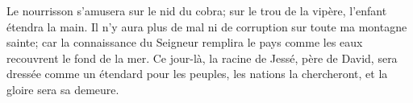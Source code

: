 Le nourrisson s’amusera sur le nid du cobra;
	sur le trou de la vipère, l’enfant étendra la main.
Il n’y aura plus de mal ni de corruption sur toute ma montagne sainte;
	car la connaissance du Seigneur remplira le pays
	comme les eaux recouvrent le fond de la mer.
Ce jour-là, la racine de Jessé, père de David,
	sera dressée comme un étendard pour les peuples,
	les nations la chercheront, et la gloire sera sa demeure.

